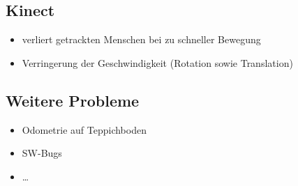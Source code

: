 \subsection{Kinect}

\begin{itemize}
	\item verliert getrackten Menschen bei zu schneller Bewegung
	\item Verringerung der Geschwindigkeit (Rotation sowie Translation)
\end{itemize}


\subsection{Weitere Probleme}

\begin{itemize}
	\item Odometrie auf Teppichboden
	\item SW-Bugs
	\item \ldots
\end{itemize}
